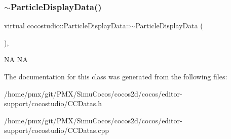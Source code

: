 \subsubsection{\texorpdfstring{$\sim$\+Particle\+Display\+Data()}{~ParticleDisplayData()}\hspace{0.1cm}{\footnotesize\ttfamily [2/2]}}
{\footnotesize\ttfamily virtual cocostudio\+::\+Particle\+Display\+Data\+::$\sim$\+Particle\+Display\+Data (\begin{DoxyParamCaption}{ }\end{DoxyParamCaption})\hspace{0.3cm}{\ttfamily [inline]}, {\ttfamily [virtual]}}

NA  NA 

The documentation for this class was generated from the following files\+:\begin{DoxyCompactItemize}
\item 
/home/pmx/git/\+P\+M\+X/\+Simu\+Cocos/cocos2d/cocos/editor-\/support/cocostudio/C\+C\+Datas.\+h\item 
/home/pmx/git/\+P\+M\+X/\+Simu\+Cocos/cocos2d/cocos/editor-\/support/cocostudio/C\+C\+Datas.\+cpp\end{DoxyCompactItemize}
